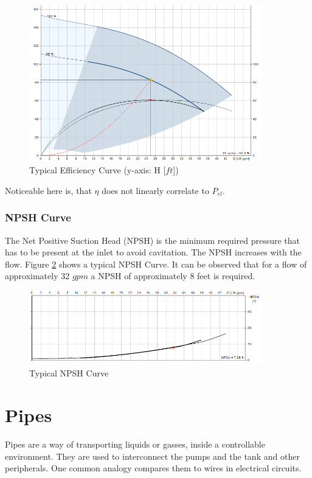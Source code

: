 \begin{figure}[h]
	\centering
	\includegraphics[width=0.9\textwidth]{figures/03physicalSetup/typicalEfficiencyCurve.PNG}
	\caption{Typical Efficiency Curve (y-axis: H [$ft$]) \cite{PumpPhoto}}
	\label{fig:typicalEfficiencyCurve}
\end{figure}
Noticeable here is,
that $\eta$ does not linearly correlate to $P_{el}$.

\subsubsection{NPSH Curve}
The Net Positive Suction Head (NPSH) is the minimum required pressure
that has to be present at the inlet to avoid cavitation.
The NPSH increases with the flow.
Figure \ref{fig:typicalNPSHCurve} shows a typical NPSH Curve.
It can be observed that for a flow of approximately 32 $gpm$
a NPSH of approximately 8 feet is required.

\begin{figure}[H]
	\centering
	\includegraphics[width=0.9\textwidth]{figures/03physicalSetup/typicalNPSHCurve.PNG}
	\caption{Typical NPSH Curve \cite{PumpPhoto}}
	\label{fig:typicalNPSHCurve}
\end{figure}

\section{Pipes}
Pipes are a way of transporting liquids or gasses, inside a controllable environment.
They are used to interconnect the pumps and the tank and other peripherals.
One common analogy compares them to wires in electrical circuits.

